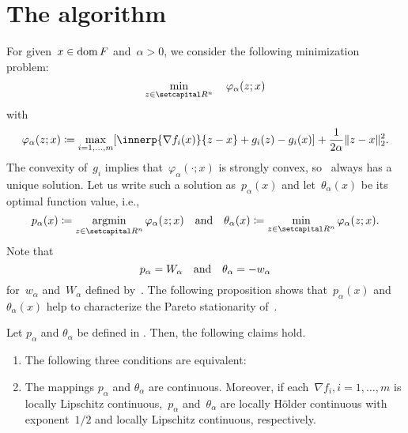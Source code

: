 \documentclass[../main]{subfiles}
\begin{document}
\section{The algorithm} 
For given~$x \in \operatorname{dom} F$ and~$\alpha > 0$, we consider the following minimization problem:
\begin{equation} \label{eq:pgm_subproblem}
    \min_{z \in \setR^n} \quad \varphi_\alpha(z; x)
\end{equation}
with
\begin{equation} \label{eq:pgm_obj}
    \varphi_\alpha(z; x) \coloneqq \max_{i = 1, \dots, m} [ \innerp{\nabla f_i(x)}{z - x} + g_i(z) - g_i(x) ] + \frac{1}{2 \alpha} \norm{ z - x }_2^2
.\end{equation}
The convexity of~$g_i$ implies that~$\varphi_\alpha(\cdot; x)$ is strongly convex, so~ always has a unique solution.
Let us write such a solution as~$p_\alpha(x)$ and let~$\theta_\alpha(x)$ be its optimal function value, i.e.,
\begin{equation} \label{eq:pgm_optimal_function}
    p_\alpha(x) \coloneqq \argmin_{z \in \setR^n} \varphi_\alpha(z; x) \eqand \theta_\alpha(x) \coloneqq \min_{z \in \setR^n} \varphi_\alpha(z; x)
.\end{equation}
Note that
\begin{equation} \label{eq:pgm_merit}
    p_\alpha = W_\alpha \quad \text{and} \quad \theta_\alpha = - w_\alpha
\end{equation}
for~$w_\alpha$ and~$W_\alpha$ defined by~.
The following proposition shows that~$p_\alpha(x)$ and~$\theta_\alpha(x)$ help to characterize the Pareto stationarity of~.
\begin{lemma} 
    Let $p_\alpha$ and $\theta_\alpha$ be defined in .
    Then, the following claims hold.
	\begin{enumerate}
        \item The following three conditions are equivalent:
             
		\item The mappings $p_\alpha$ and $\theta_\alpha$ are continuous.
            Moreover, if each~$\nabla f_i, i = 1, \dots, m$ is locally Lipschitz continuous,~$p_\alpha$ and~$\theta_\alpha$ are locally H\"older continuous with exponent~$1 / 2$ and locally Lipschitz continuous, respectively. 
	\end{enumerate}
\end{lemma}
\end{document}
